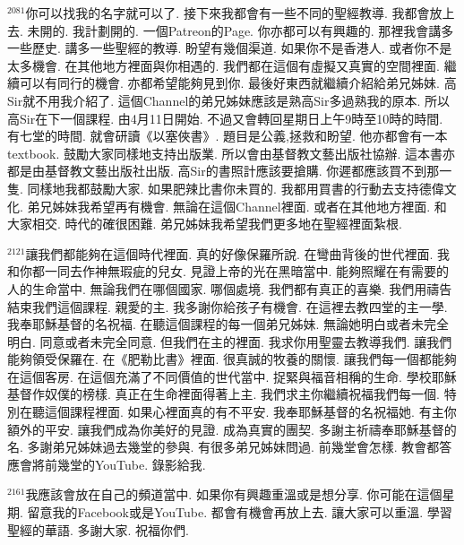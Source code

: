\documentclass{book}
\begin{document}
$^{2081}$你可以找我的名字就可以了.
接下來我都會有一些不同的聖經教導.
我都會放上去.
未開的.
我計劃開的.
一個Patreon的Page.
你亦都可以有興趣的.
那裡我會講多一些歷史.
講多一些聖經的教導.
盼望有幾個渠道.
如果你不是香港人.
或者你不是太多機會.
在其他地方裡面與你相遇的.
我們都在這個有虛擬又真實的空間裡面.
繼續可以有同行的機會.
亦都希望能夠見到你.
最後好東西就繼續介紹給弟兄姊妹.
高Sir就不用我介紹了.
這個Channel的弟兄姊妹應該是熟高Sir多過熟我的原本.
所以高Sir在下一個課程.
由4月11日開始.
不過又會轉回星期日上午9時至10時的時間.
有七堂的時間.
就會研讀《以塞俠書》.
題目是公義,拯救和盼望.
他亦都會有一本textbook.
鼓勵大家同樣地支持出版業.
所以會由基督教文藝出版社協辦.
這本書亦都是由基督教文藝出版社出版.
高Sir的書照計應該要搶購.
你遲都應該買不到那一隻.
同樣地我都鼓勵大家.
如果肥辣比書你未買的.
我都用買書的行動去支持德偉文化.
弟兄姊妹我希望再有機會.
無論在這個Channel裡面.
或者在其他地方裡面.
和大家相交.
時代的確很困難.
弟兄姊妹我希望我們更多地在聖經裡面紮根.

$^{2121}$讓我們都能夠在這個時代裡面.
真的好像保羅所說.
在彎曲背後的世代裡面.
我和你都一同去作神無瑕疵的兒女.
見證上帝的光在黑暗當中.
能夠照耀在有需要的人的生命當中.
無論我們在哪個國家.
哪個處境.
我們都有真正的喜樂.
我們用禱告結束我們這個課程.
親愛的主.
我多謝你給孩子有機會.
在這裡去教四堂的主一學.
我奉耶穌基督的名祝福.
在聽這個課程的每一個弟兄姊妹.
無論她明白或者未完全明白.
同意或者未完全同意.
但我們在主的裡面.
我求你用聖靈去教導我們.
讓我們能夠領受保羅在.
在《肥勒比書》裡面.
很真誠的牧養的關懷.
讓我們每一個都能夠在這個客房.
在這個充滿了不同價值的世代當中.
捉緊與福音相稱的生命.
學校耶穌基督作奴僕的榜樣.
真正在生命裡面得著上主.
我們求主你繼續祝福我們每一個.
特別在聽這個課程裡面.
如果心裡面真的有不平安.
我奉耶穌基督的名祝福她.
有主你額外的平安.
讓我們成為你美好的見證.
成為真實的團契.
多謝主祈禱奉耶穌基督的名.
多謝弟兄姊妹過去幾堂的參與.
有很多弟兄姊妹問過.
前幾堂會怎樣.
教會都答應會將前幾堂的YouTube.
錄影給我.

$^{2161}$我應該會放在自己的頻道當中.
如果你有興趣重溫或是想分享.
你可能在這個星期.
留意我的Facebook或是YouTube.
都會有機會再放上去.
讓大家可以重溫.
學習聖經的華語.
多謝大家.
祝福你們.
\newpage
\end{document}

